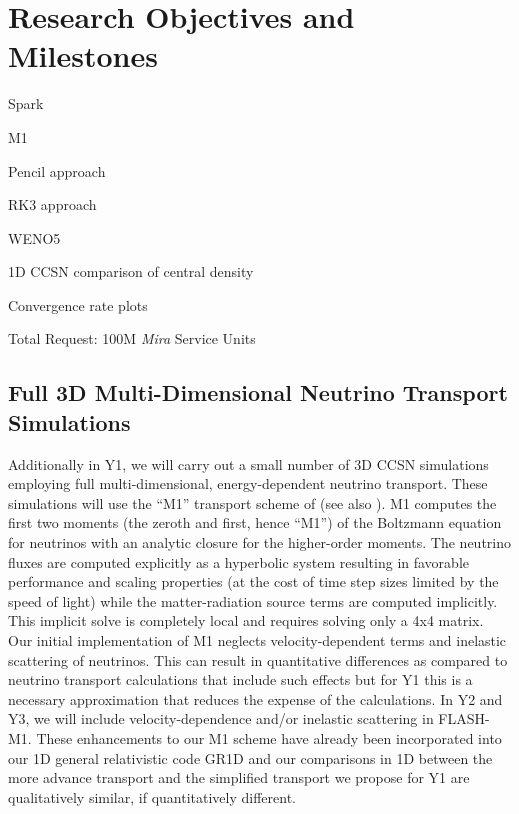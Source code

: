 \section{Research Objectives and Milestones}
\label{sec:objectives}

Spark

M1

Pencil approach

RK3 approach

WENO5

1D CCSN comparison of central density

Convergence rate plots 

\vspace{0.1in}  Total Request: 100M {\it Mira} Service Units \vspace{-0.1in}


\subsection{Full 3D Multi-Dimensional Neutrino Transport Simulations}
\label{sec:3Dm1}

Additionally in Y1, we will carry out a small number of 3D CCSN simulations employing full multi-dimensional, energy-dependent neutrino transport.
These simulations will use the ``M1'' transport scheme of \citet{OConnor:2013ja} (see also \citep{Kuroda:2012fv}).
M1 computes the first two moments (the zeroth and first, hence ``M1'') of the Boltzmann equation for neutrinos with an analytic closure for the higher-order moments.
The neutrino fluxes are computed explicitly as a hyperbolic system resulting in favorable performance and scaling properties (at the cost of time step sizes limited by the speed of light) while the matter-radiation source terms are computed implicitly.
This implicit solve is completely local and requires solving only a 4x4 matrix.
Our initial implementation of M1 neglects velocity-dependent terms and inelastic scattering of neutrinos.
This can result in quantitative differences as compared to neutrino transport calculations that include such effects \citep[see][]{Lentz:2012fy} but for Y1 this is a necessary approximation that reduces the expense of the calculations.
In Y2 and Y3, we will include velocity-dependence and/or inelastic scattering in FLASH-M1.
These enhancements to our M1 scheme have already been incorporated into our 1D general relativistic code GR1D and our comparisons in 1D between the more advance transport and the simplified transport we propose for Y1 are qualitatively similar, if quantitatively different.

